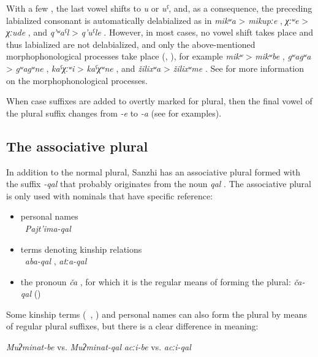 With a few , the last vowel shifts to \textit{u} or \textit{uˁ}, and, as a consequence, the preceding labialized consonant is automatically delabialized as in \textit{mikʷa} > \textit{mikupːe} , \textit{χːʷe} > \textit{χːude} , and \textit{q'ʷaˁl} > \textit{q'uˁle} . However, in most cases, no vowel shift takes place and thus labialized  are not delabialized, and only the above-mentioned morphophonological processes take place (, ), for example \textit{mikʷ} > \textit{mikʷbe} , \textit{gʷagʷa} > \textit{gʷagʷne} , \textit{kaˁχːʷi} > \textit{kaˁχʷne} , and \textit{žilixʷa} > \textit{žilixʷme} . See  for more information on the morphophonological processes.

When case suffixes are added to  overtly marked for plural, then the final vowel of the plural suffix changes from \textit{-e} to \textit{-a} (see  for examples).

\subsection{The associative plural}
\label{ssec:MorphophonologicalrulesPlural}
In addition to the normal plural, Sanzhi has an associative plural formed with the suffix \textit{-qal} that probably originates from the noun \textit{qal} . The associative plural is only used with nominals that have specific reference:
%
\begin{itemize}
	\item	personal names\\
		\teg\ \textit{Pajt'ima-qal} 
	\item	terms denoting kinship relations\\
		\teg\ \textit{aba-qal} , \textit{atːa-qal} 
	\item	the pronoun \textit{ča} , for which it is the regular means of forming the plural: \textit{ča-qal} ()
\end{itemize}

Some kinship terms (\teg\ , ) and personal names can also form the plural by means of regular plural suffixes, but there is a clear difference in meaning:
%
\begin{exe}
	\ex	\label{ex:Muʔminat the people associated with her}
	\begin{xlist}
		\ex	\textit{Muʔminat-be} 
		\ex	vs. \textit{Muʔminat-qal} 
		\ex	\textit{acːi-be} 
		\ex	vs. \textit{acːi-qal} 
	\end{xlist}
\end{exe}

